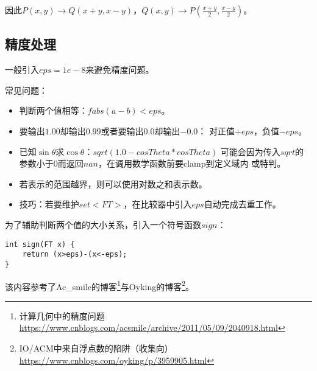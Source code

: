 因此$P(x,y)\rightarrow Q(x+y,x-y)$，$Q(x,y)
\rightarrow P(\frac{x+y}{2},\frac{x-y}{2})$。
\subsection{精度处理}
一般引入$eps=1e-8$来避免精度问题。

常见问题：
\begin{itemize}
    \item 判断两个值相等：$fabs(a-b)<eps$。
    \item 要输出$1.00$却输出$0.99$或者要输出$0.0$却输出$-0.0$：
        对正值$+eps$，负值$-eps$。
    \item 已知$\sin \theta$求$\cos \theta$：$sqrt(1.0-cosTheta*cosTheta)$
    可能会因为传入$sqrt$的参数小于0而返回$nan$，在调用数学函数前要clamp到定义域内
    或特判。
    \item 若表示的范围越界，则可以使用对数之和表示数。
    \item 技巧：若要维护$set<FT>$，在比较器中引入$eps$自动完成去重工作。
\end{itemize}

为了辅助判断两个值的大小关系，引入一个符号函数$sign$：
\begin{lstlisting}
int sign(FT x) {
    return (x>eps)-(x<-eps);
}
\end{lstlisting}


该内容参考了Ac\_smile的博客\footnote{计算几何中的精度问题\\
    \url{https://www.cnblogs.com/acsmile/archive/2011/05/09/2040918.html}
}与Oyking的博客\footnote{
    IO/ACM中来自浮点数的陷阱（收集向）
    \url{https://www.cnblogs.com/oyking/p/3959905.html}
}。
